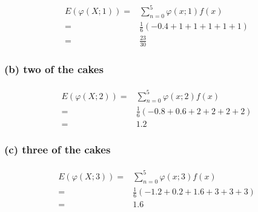 \documentclass{article}
\begin{document}
                \paragraph{
                    \begin{equation*}
                        \begin{split}
                            E(\varphi(X;1))=&\sum _{n=0} ^5 \varphi(x;1)f(x)\\
                                        =&\frac{1}{6}(-0.4+1+1+1+1+1)\\
                                        =&\frac{23}{30}
                        \end{split}
                    \end{equation*}
                }
            \subsubsection*{ (b) two of the cakes}
            \paragraph{
                \begin{equation*}
                    \begin{split}
                        E(\varphi(X;2))=&\sum _{n=0} ^5 \varphi(x;2)f(x)\\
                                    =&\frac{1}{6}(-0.8+0.6+2+2+2+2)\\
                                    =&1.2
                    \end{split}
                \end{equation*}
            }
            \subsubsection*{  (c) three of the cakes}
            \paragraph{
                \begin{equation*}
                    \begin{split}
                        E(\varphi(X;3))=&\sum _{n=0} ^5 \varphi(x;3)f(x)\\
                                    =&\frac{1}{6}(-1.2+0.2+1.6+3+3+3)\\
                                    =&1.6
                    \end{split}
                \end{equation*}
            }
\end{document}

